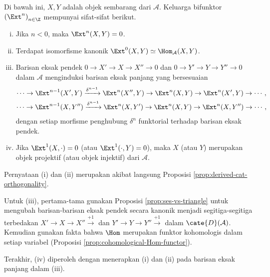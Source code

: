 \begin{proposisi}\label{prop:Ext-generalities}
	Di bawah ini, $X,Y$ adalah objek sembarang dari $\mathcal{A}$. Keluarga
	bifunktor $\left( \Ext^n \right)_{n \in \Z}$ mempunyai sifat-sifat berikut.
	\begin{enumerate}[(i)]
		\item Jika $n < 0$, maka $\Ext^n(X, Y) = 0$.
		\item Terdapat isomorfisme kanonik
		$\Ext^0(X, Y) \simeq \Hom_{\mathcal{A}}(X, Y)$.
		\item Barisan eksak pendek
		$0 \to X' \to X \to X'' \to 0$ dan
		$0 \to Y' \to Y \to Y'' \to 0$ dalam $\mathcal{A}$ menginduksi
		barisan eksak panjang yang bersesuaian
		\begin{gather*}
			\cdots \to \Ext^{n-1}(X', Y) \xrightarrow{\delta^{n-1}} \Ext^n(X'', Y) \to \Ext^n(X, Y) \to \Ext^n(X', Y) \to \cdots , \\
			\cdots \to \Ext^{n-1}(X, Y'') \xrightarrow{\delta^{n-1}} \Ext^n(X, Y') \to \Ext^n(X, Y) \to \Ext^n(X, Y'') \to \cdots ,
		\end{gather*}
		dengan setiap morfisme penghubung $\delta^n$ funktorial terhadap barisan
		eksak pendek.
		\item Jika $\Ext^1(X, \cdot) = 0$ (atau
		$\Ext^1(\cdot, Y) = 0$), maka $X$ (atau $Y$) merupakan objek projektif
		(atau objek injektif) dari $\mathcal{A}$.
	\end{enumerate}
\end{proposisi}

\begin{bukti}
	Pernyataan (i) dan (ii) merupakan akibat langsung Proposisi
	\ref{prop:derived-cat-orthogonality}.
	
	Untuk (iii), pertama-tama gunakan Proposisi \ref{prop:ses-vs-triangle} untuk
	mengubah barisan-barisan eksak pendek secara kanonik menjadi segitiga-segitiga
	terbedakan $X' \to X \to X'' \xrightarrow{+1}$ dan
	$Y' \to Y \to Y'' \xrightarrow{+1}$ dalam $\cate{D}(\mathcal{A})$.
	Kemudian gunakan fakta bahwa $\Hom$ merupakan funktor kohomologis dalam
	setiap variabel (Proposisi \ref{prop:cohomological-Hom-functor}).
	
	Terakhir, (iv) diperoleh dengan menerapkan (i) dan (ii) pada barisan eksak
	panjang dalam (iii).
\end{bukti}

